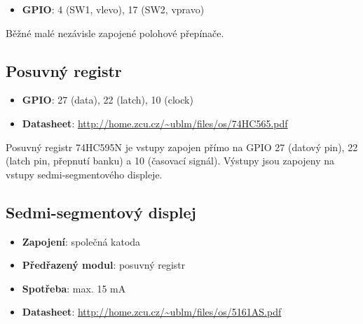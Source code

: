 \documentclass{article}
\newcommand\lang[2]{#1}
\begin{document}
\begin{itemize}[nosep]
	\item \textbf{GPIO}: 4 (\lang{SW1, vlevo}{SW1, left}), 17 (\lang{SW2, vpravo}{SW2, right})
\end{itemize}

\vspace{1em}

\noindent
\lang{Běžné malé nezávisle zapojené polohové přepínače.}{Common switches, connected independently.}

\subsection{\lang{Posuvný registr}{Shift register}}

\begin{itemize}[nosep]
	\item \textbf{GPIO}: 27 (data), 22 (latch), 10 (clock)
	\item \textbf{Datasheet}: \url{http://home.zcu.cz/~ublm/files/os/74HC565.pdf}
\end{itemize}

\vspace{1em}

\noindent
\lang{Posuvný registr 74HC595N je vstupy zapojen přímo na GPIO 27 (datový pin), 22 (latch pin, přepnutí banku) a 10 (časovací signál). Výstupy jsou zapojeny na vstupy sedmi-segmentového displeje.}{The shift register 74HC595N is connected to GPIO 27 (data pin), 22 (latch pin, bank shift) and 10 (timing signal). Outputs are connected to inputs of the 7-segment display.}

\subsection{\lang{Sedmi-segmentový displej}{7-segment display}}

\begin{itemize}[nosep]
	\item \lang{\textbf{Zapojení}: společná katoda}{\textbf{Wiring}: common cathode}
    \item \textbf{\lang{Předřazený modul}{Preceding module}}: \lang{posuvný registr}{shift register}
	\item \textbf{\lang{Spotřeba}{Current}}: max. 15 mA
	\item \textbf{Datasheet}: \url{http://home.zcu.cz/~ublm/files/os/5161AS.pdf}
\end{itemize}

\vspace{1em}
\end{document}
